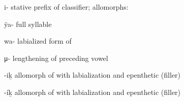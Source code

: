\begin{morphdesc}[resume*=alphalist]
\item[i-]\label{m:i-stv}
	stative prefix of classifier;
	\newline
	allomorphs:
	\begin{allolist}
	\item[ÿa-]	full syllable
	\item[wa-]	labialized form of 
	\item[μ-]	lengthening of preceding vowel
	\end{allolist}

\item[-iḵ]\label{m:-iḵ}
	allomorph of  with labialization and epenthetic (filler) 

\item[-íḵ]\label{m:-íḵ}
	allomorph of  with labialization and epenthetic (filler) 

\end{morphdesc}

